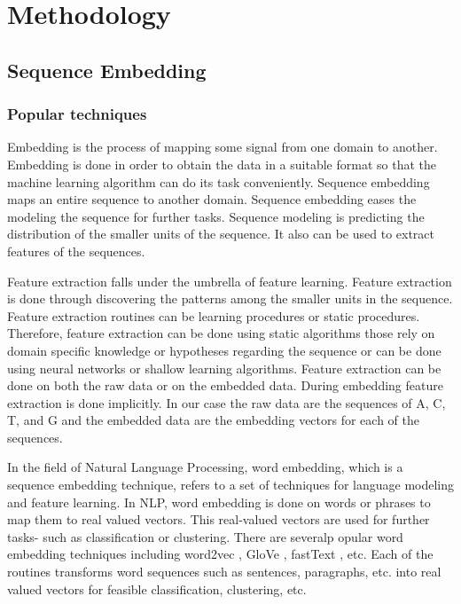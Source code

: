 \documentclass[oneside, twocolumn, a4paper, 10pt]{IEEEtran}
\begin{document}
\section{Methodology}
\subsection{Sequence Embedding}
\subsubsection{Popular techniques}
Embedding is the process of mapping some signal from one domain to another. Embedding is done in order to obtain the data in a suitable format so that the machine learning algorithm can do its task conveniently. Sequence embedding maps an entire sequence to another domain. Sequence embedding eases the modeling the sequence for further tasks. Sequence modeling is predicting the distribution of the smaller units of the sequence. It also can be used to extract features of the sequences.\\
\par 
Feature extraction falls under the umbrella of feature learning. Feature extraction is done through discovering the patterns among the smaller units in the sequence. Feature extraction routines can be learning procedures or static procedures. Therefore, feature extraction can be done using static algorithms those rely on domain specific knowledge or hypotheses regarding the sequence or can be done using neural networks or shallow learning algorithms. Feature extraction can be done on both the raw data or on the embedded data. During embedding feature extraction is done implicitly. In our case the raw data are the sequences of A, C, T, and G and the embedded data are the embedding vectors for each of the sequences.\\ 
\par 
In the field of Natural Language Processing, word embedding, which is a sequence embedding technique, refers to a set of techniques for language modeling and feature learning. In NLP, word embedding is done on words or phrases to map them to real valued vectors. This real-valued vectors are used for further tasks- such as classification or clustering. There are severalp opular word embedding techniques including word2vec \cite{17}, GloVe \cite{18}, fastText \cite{19} \cite{20}, etc. Each of the routines transforms word sequences such as sentences, paragraphs, etc. into real valued vectors for feasible classification, clustering, etc.\\
\end{document}
